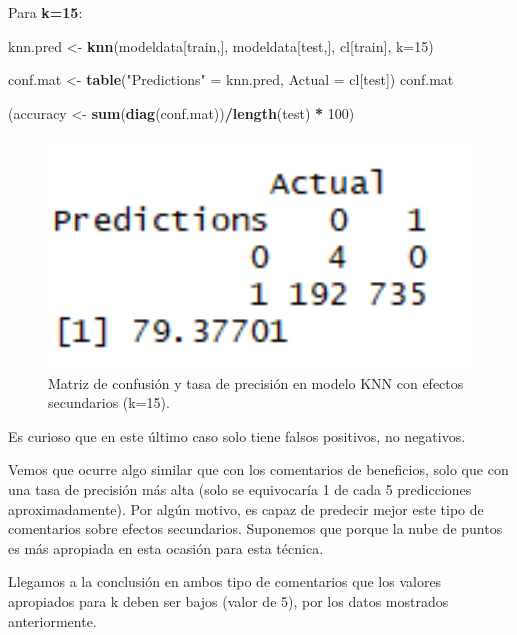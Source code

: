 \documentclass[spanish,]{article}
\newenvironment{Shaded}{\begin{snugshade}}{\end{snugshade}}
\newcommand{\KeywordTok}[1]{\textcolor[rgb]{0.13,0.29,0.53}{\textbf{#1}}}
\newcommand{\DataTypeTok}[1]{\textcolor[rgb]{0.13,0.29,0.53}{#1}}
\newcommand{\DecValTok}[1]{\textcolor[rgb]{0.00,0.00,0.81}{#1}}
\newcommand{\StringTok}[1]{\textcolor[rgb]{0.31,0.60,0.02}{#1}}
\newcommand{\OperatorTok}[1]{\textcolor[rgb]{0.81,0.36,0.00}{\textbf{#1}}}
\newcommand{\NormalTok}[1]{#1}
\begin{document}
Para \textbf{k=15}:

\begin{Shaded}
\begin{Highlighting}[]
\NormalTok{knn.pred <-}\StringTok{ }\KeywordTok{knn}\NormalTok{(modeldata[train,], modeldata[test,], cl[train], }\DataTypeTok{k=}\DecValTok{15}\NormalTok{) }

\NormalTok{conf.mat <-}\StringTok{ }\KeywordTok{table}\NormalTok{(}\StringTok{"Predictions"}\NormalTok{ =}\StringTok{ }\NormalTok{knn.pred, }\DataTypeTok{Actual =}\NormalTok{ cl[test])}
\NormalTok{conf.mat}

\NormalTok{(accuracy <-}\StringTok{ }\KeywordTok{sum}\NormalTok{(}\KeywordTok{diag}\NormalTok{(conf.mat))}\OperatorTok{/}\KeywordTok{length}\NormalTok{(test) }\OperatorTok{*}\StringTok{ }\DecValTok{100}\NormalTok{)}
\end{Highlighting}
\end{Shaded}

\begin{figure}[h]
    \centering
    \includegraphics[width=1\textwidth]{figuras/KNN/effects_k15.png}
    \caption{Matriz de confusión y tasa de precisión en modelo KNN con efectos secundarios (k=15).}
    \label{fig:KNN:effectsK15}
\end{figure}

Es curioso que en este último caso solo tiene falsos positivos, no
negativos.

Vemos que ocurre algo similar que con los comentarios de beneficios,
solo que con una tasa de precisión más alta (solo se equivocaría 1 de
cada 5 predicciones aproximadamente). Por algún motivo, es capaz de
predecir mejor este tipo de comentarios sobre efectos secundarios.
Suponemos que porque la nube de puntos es más apropiada en esta ocasión
para esta técnica.

Llegamos a la conclusión en ambos tipo de comentarios que los valores
apropiados para k deben ser bajos (valor de 5), por los datos mostrados
anteriormente.
\end{document}
